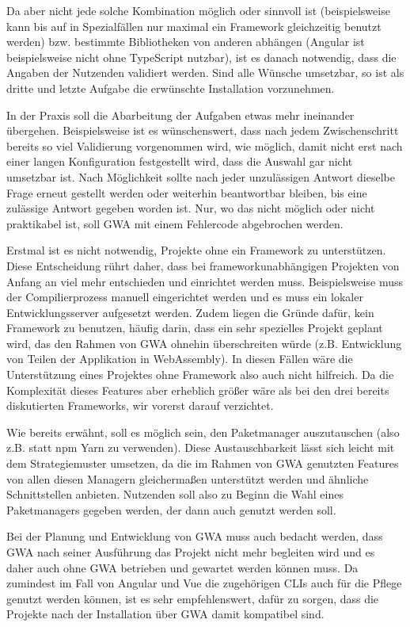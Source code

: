 Da aber nicht jede solche Kombination möglich oder sinnvoll ist (beispielsweise kann bis auf in Spezialfällen nur maximal ein Framework gleichzeitig benutzt werden) bzw. bestimmte Bibliotheken von anderen abhängen (Angular ist beispielsweise nicht ohne TypeScript nutzbar), ist es danach notwendig, dass die Angaben der Nutzenden validiert werden. Sind alle Wünsche umsetzbar, so ist als dritte und letzte Aufgabe die erwünschte Installation vorzunehmen.

In der Praxis soll die Abarbeitung der Aufgaben etwas mehr ineinander übergehen. Beispielsweise ist es wünschenswert, dass nach jedem Zwischenschritt bereits so viel Validierung vorgenommen wird, wie möglich, damit nicht erst nach einer langen Konfiguration festgestellt wird, dass die Auswahl gar nicht umsetzbar ist. Nach Möglichkeit sollte nach jeder unzulässigen Antwort dieselbe Frage erneut gestellt werden oder weiterhin beantwortbar bleiben, bis eine zulässige Antwort gegeben worden ist. Nur, wo das nicht möglich oder nicht praktikabel ist, soll \gls{GWA} mit einem Fehlercode abgebrochen werden.

Erstmal ist es nicht notwendig, Projekte ohne ein Framework zu unterstützen. Diese Entscheidung rührt daher, dass bei frameworkunabhängigen Projekten von Anfang an viel mehr entschieden und einrichtet werden muss. Beispielsweise muss der Compilierprozess manuell eingerichtet werden und es muss ein lokaler Entwicklungsserver aufgesetzt werden. Zudem liegen die Gründe dafür, kein Framework zu benutzen, häufig darin, dass ein sehr spezielles Projekt geplant wird, das den Rahmen von \gls{GWA} ohnehin überschreiten würde (z.B. Entwicklung von Teilen der Applikation in WebAssembly). In diesen Fällen wäre die Unterstützung eines Projektes ohne Framework also auch nicht hilfreich. Da die Komplexität  dieses Features aber erheblich größer wäre als bei den drei bereits diskutierten Frameworks, wir vorerst darauf verzichtet.

Wie bereits erwähnt, soll es möglich sein, den Paketmanager auszutauschen (also z.B. statt \gls{npm} Yarn zu verwenden). Diese Austauschbarkeit lässt sich leicht mit dem Strategiemuster umsetzen, da die im Rahmen von \gls{GWA} genutzten Features von allen diesen Managern gleichermaßen unterstützt werden und ähnliche Schnittstellen anbieten. Nutzenden soll also zu Beginn die Wahl eines Paketmanagers gegeben werden, der dann auch genutzt werden soll.

Bei der Planung und Entwicklung von \gls{GWA} muss auch bedacht werden, dass \gls{GWA} nach seiner Ausführung das Projekt nicht mehr begleiten wird und es daher auch ohne \gls{GWA} betrieben und gewartet werden können muss. Da zumindest im Fall von Angular und Vue die zugehörigen \gls{CLI}s auch für die Pflege genutzt werden können, ist es sehr empfehlenswert, dafür zu sorgen, dass die Projekte nach der Installation über \gls{GWA} damit kompatibel sind.

